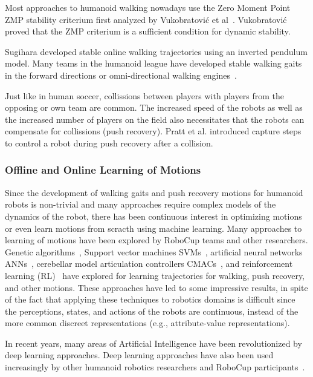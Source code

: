 \documentclass{article}
\begin{document}
Most approaches to humanoid walking nowadays use the Zero Moment Point ZMP stability criterium first analyzed by Vukobratović et al~\cite{Vukobratovic2001}.
Vukobratović proved that the ZMP criterium is a sufficient condition for dynamic stability.

Sugihara developed stable online walking trajectories using an inverted pendulum model.
Many teams in the humanoid league have developed stable walking gaits in the forward directions or omni-directional walking engines~\cite{Sugihara2002}.

Just like in human soccer, collissions between players with players from the opposing or own team are common.
The increased speed of the robots as well as the increased number of players on the field also necessitates that the robots can compensate for collissions (push recovery).
Pratt et al. introduced capture steps to control a robot during push recovery after a collision\cite{Pratt2006}.

\subsubsection{Offline and Online Learning of Motions}

Since the development of walking gaits and push recovery motions for humanoid robots is non-trivial and many approaches require complex models of the dynamics of the robot, there has been continuous interest in optimizing motions or even learn motions from scracth using machine learning.
Many approaches to learning of motions have been explored by RoboCup teams and other researchers.
Genetic algorithms~\cite{Huan2018}, Support vector machines SVMs~\cite{Wang2013}, artificial neural networks ANNs~\cite{Kim2012}, cerebellar model articulation controllers CMACs~\cite{Sabourin2005}, and reinforcement learning (RL)~\cite{Morimoto2004} have explored for learning trajectories for walking, push recovery, and other motions. 
These approaches have led to some impressive results, in spite of the fact that applying these techniques to robotics domains is difficult since the perceptions, states, and actions of the robots are continuous, instead of the more common discreet representations (e.g., attribute-value representations).

In recent years, many areas of Artificial Intelligence have been revolutionized by deep learning approaches.
Deep learning approaches have also been used increasingly by other humanoid robotics researchers and RoboCup participants~\cite{Hwangbo2019}.
\end{document}
